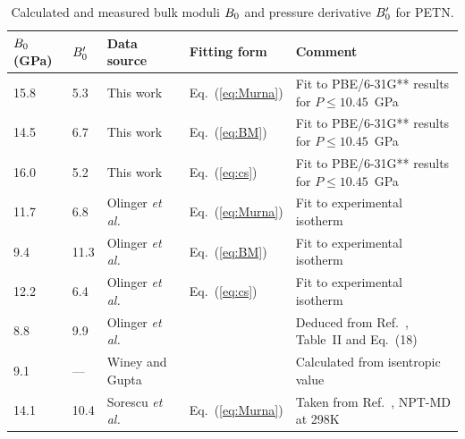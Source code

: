 \documentclass[prb,aps,nobibnotes,twocolumn,doublespace,twocolumngrid,superbib]{revtex4}
\begin{document}
\begin{table}[p]
\caption{Calculated and measured bulk moduli $B_0$ and pressure
derivative ${B'_0}$ for PETN.}
\begin{center}
\begin{tabular}{lllll}
\hline\hline
$B_0$(GPa) &   ${B'_0}$   &   Data source  
&    Fitting form &      Comment \\
\hline
15.8 & 5.3 & This work &  Eq.~(\ref{eq:Murna}) 
& Fit to PBE/6-31G** results for $P \le 10.45$~GPa \\
14.5 & 6.7 & This work & Eq.~(\ref{eq:BM}) 
& Fit to PBE/6-31G** results for $P \le 10.45$~GPa \\
16.0 & 5.2 & This work & Eq.~(\ref{eq:cs}) 
& Fit to PBE/6-31G** results for $P \le 10.45$~GPa \\
11.7 & 6.8 & Olinger {\it et al.}~\cite{Olinger_1975v62} 
& Eq.~(\ref{eq:Murna}) 
& Fit to experimental isotherm\\
9.4 & 11.3 & Olinger {\it et al.}~\cite{Olinger_1975v62} & Eq.~(\ref{eq:BM})
& Fit to experimental isotherm \\
12.2 & 6.4 & Olinger {\it et al.}~\cite{Olinger_1975v62} & Eq.~(\ref{eq:cs}) 
& Fit to experimental isotherm\\
8.8 & 9.9 &   Olinger {\it et al.}~\cite{Olinger_1976}&   & 
Deduced from Ref.~\cite{Olinger_1976}, Table~II and Eq.~(18) \\
 9.1 & --- &   Winey and Gupta~\cite{Winey_2001v90} &     & Calculated from isentropic value \\
14.1 &10.4 &Sorescu {\it et al.}~\cite{Sorescu_1999v103} & Eq.~(\ref{eq:Murna})
& Taken from Ref.~\cite{Sorescu_1999v103}, NPT-MD at 298K\\
\hline\hline
\end{tabular}
\end{center}
\label{tab:table3}
\end{table}
\end{document}
